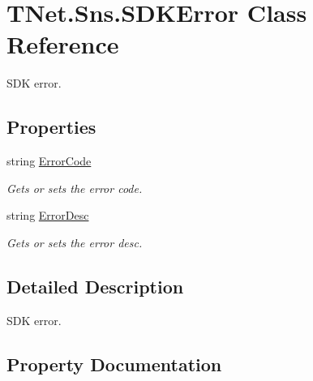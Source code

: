 \hypertarget{class_t_net_1_1_sns_1_1_s_d_k_error}{}\section{T\+Net.\+Sns.\+S\+D\+K\+Error Class Reference}
\label{class_t_net_1_1_sns_1_1_s_d_k_error}


S\+DK error.  


\subsection*{Properties}
\begin{DoxyCompactItemize}
\item 
string \mbox{\hyperlink{class_t_net_1_1_sns_1_1_s_d_k_error_abd9aa8048a78da00baca86c9f7d09ea6}{Error\+Code}}
\begin{DoxyCompactList}\small\item\em Gets or sets the error code. \end{DoxyCompactList}\item 
string \mbox{\hyperlink{class_t_net_1_1_sns_1_1_s_d_k_error_ad048a85c2fb7ba654f2e46776936f93c}{Error\+Desc}}
\begin{DoxyCompactList}\small\item\em Gets or sets the error desc. \end{DoxyCompactList}\end{DoxyCompactItemize}


\subsection{Detailed Description}
S\+DK error. 



\subsection{Property Documentation}
\mbox{\label{class_t_net_1_1_sns_1_1_s_d_k_error_abd9aa8048a78da00baca86c9f7d09ea6}} 

